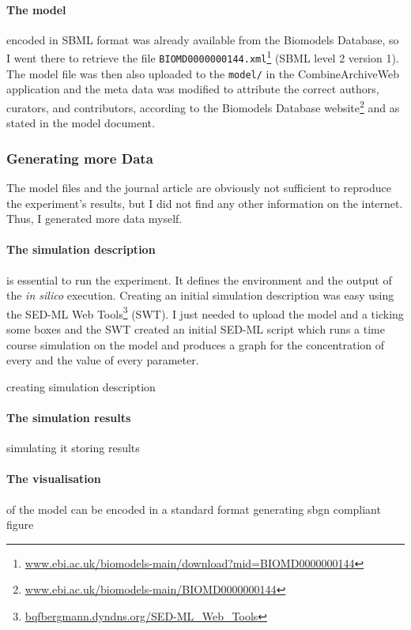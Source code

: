 \paragraph{The model} encoded in SBML format was already available from the Biomodels Database, so I went there to retrieve the file \texttt{BIOMD0000000144.xml}\footnote{\href{http://www.ebi.ac.uk/biomodels-main/download?mid=BIOMD0000000144}{www.ebi.ac.uk/biomodels-main/download?mid=BIOMD0000000144}} (SBML level 2 version 1).
The model file was then also uploaded to the \texttt{model/} in the CombineArchiveWeb application and the meta data was modified to attribute the correct authors, curators, and contributors, according to the Biomodels Database website\footnote{\href{http://www.ebi.ac.uk/biomodels-main/BIOMD0000000144}{www.ebi.ac.uk/biomodels-main/BIOMD0000000144}} and as stated in the model document.


\subsubsection{Generating more Data}
The model files and the journal article are obviously not sufficient to reproduce the experiment's results, but I did not find any other information on the internet.
Thus, I generated more data myself.

\paragraph{The simulation description} is essential to run the experiment.
It defines the environment and the output of the \textit{in silico} execution.
Creating an initial simulation description was easy using the SED-ML Web Tools\footnote{\href{http://bqfbergmann.dyndns.org/SED-ML_Web_Tools}{bqfbergmann.dyndns.org/SED-ML\_Web\_Tools}} (SWT).
I just needed to upload the model and a ticking some boxes and the SWT created an initial SED-ML script which runs a time course simulation on the model and produces a graph for the concentration of every and the value of every parameter.


creating simulation description

\paragraph{The simulation results}
simulating it
storing results

\paragraph{The visualisation} of the model can be encoded in a standard format
generating sbgn compliant figure



